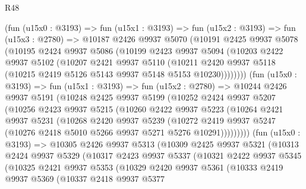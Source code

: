 \begin{lexlean}{R48}
\begin{coremodule}
        (fun (u15x0 : @3193) =>
        fun (u15x1 : @3193) =>
        fun (u15x2 : @3193) =>
        fun (u15x3 : @2780) =>
        @10187
          @2426
          @9937
          @5070
          (@10191
            @2425
            @9937
            @5078
            (@10195
              @2424
              @9937
              @5086
              (@10199
                @2423
                @9937
                @5094
                (@10203
                  @2422
                  @9937
                  @5102
                  (@10207
                    @2421
                    @9937
                    @5110
                    (@10211
                      @2420
                      @9937
                      @5118
                      (@10215 @2419 @5126 @5143 @9937 @5148 @5153 @10230))))))))
        (fun (u15x0 : @3193) =>
        fun (u15x1 : @3193) =>
        fun (u15x2 : @2780) =>
        @10244
          @2426
          @9937
          @5191
          (@10248
            @2425
            @9937
            @5199
            (@10252
              @2424
              @9937
              @5207
              (@10256
                @2423
                @9937
                @5215
                (@10260
                  @2422
                  @9937
                  @5223
                  (@10264
                    @2421
                    @9937
                    @5231
                    (@10268
                      @2420
                      @9937
                      @5239
                      (@10272
                        @2419
                        @9937
                        @5247
                        (@10276 @2418 @5010 @5266 @9937 @5271 @5276 @10291)))))))))
        (fun (u15x0 : @3193) =>
        @10305
          @2426
          @9937
          @5313
          (@10309
            @2425
            @9937
            @5321
            (@10313
              @2424
              @9937
              @5329
              (@10317
                @2423
                @9937
                @5337
                (@10321
                  @2422
                  @9937
                  @5345
                  (@10325
                    @2421
                    @9937
                    @5353
                    (@10329
                      @2420
                      @9937
                      @5361
                      (@10333
                        @2419
                        @9937
                        @5369
                        (@10337
                          @2418
                          @9937
                          @5377

\end{coremodule}
\end{lexlean}
